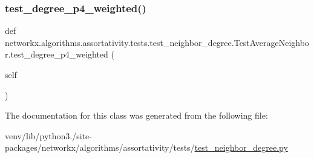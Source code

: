 \subsubsection{\texorpdfstring{test\+\_\+degree\+\_\+p4\+\_\+weighted()}{test\_degree\_p4\_weighted()}}
{\footnotesize\ttfamily def networkx.\+algorithms.\+assortativity.\+tests.\+test\+\_\+neighbor\+\_\+degree.\+Test\+Average\+Neighbor.\+test\+\_\+degree\+\_\+p4\+\_\+weighted (\begin{DoxyParamCaption}\item[{}]{self }\end{DoxyParamCaption})}



The documentation for this class was generated from the following file\+:\begin{DoxyCompactItemize}
\item 
venv/lib/python3./site-\/packages/networkx/algorithms/assortativity/tests/\hyperlink{test__neighbor__degree_8py}{test\+\_\+neighbor\+\_\+degree.\+py}\end{DoxyCompactItemize}
